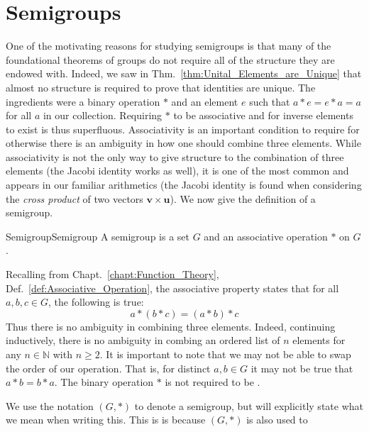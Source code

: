 \section{Semigroups}
    One of the motivating reasons for studying semigroups is that many of the
    foundational theorems of groups do not require all of the structure they are
    endowed with. Indeed, we saw in Thm.~\ref{thm:Unital_Elements_are_Unique}
    that almost no structure is required to prove that identities are unique.
    The ingredients were a binary operation $*$ and an element $e$ such that
    $a*e=e*a=a$ for all $a$ in our collection. Requiring $*$ to be associative
    and for inverse elements to exist is thus superfluous. Associativity is an
    important condition to require for otherwise there is an ambiguity in how
    one should combine three elements. While associativity is not the only way
    to give structure to the combination of three elements (the Jacobi identity
    works as well), it is one of the most common and
    appears in our familiar arithmetics (the Jacobi identity is found when
    considering the \textit{cross product} of two vectors
    $\mathbf{v}\times\mathbf{u}$). We now give the
    definition of a semigroup.
    \begin{fdefinition}{Semigroup}{Semigroup}
        A \gls{semigroup} is a set $G$ and an \gls{associative operation} $*$
        on $G$.
    \end{fdefinition}
    Recalling from Chapt.~\ref{chapt:Function_Theory},
    Def.~\ref{def:Associative_Operation}, the associative property states that
    for all $a,b,c\in{G}$, the following is true:
    \begin{equation}
        a*(b*c)=(a*b)*c
    \end{equation}
    Thus there is no ambiguity in combining three elements. Indeed, continuing
    inductively, there is no ambiguity in combing an ordered list of $n$
    elements for any $n\in\mathbb{N}$ with $n\geq{2}$. It is important to note
    that we may not be able to swap the order of our operation. That is, for
    distinct $a,b\in{G}$ it may not be true that $a*b=b*a$. The binary operation
    $*$ is not required to be 
    .
    \par\hfill\par
    We use the notation $(G,*)$ to denote a semigroup, but will explicitly state
    what we mean when writing this. This is is because $(G,*)$ is also used to
